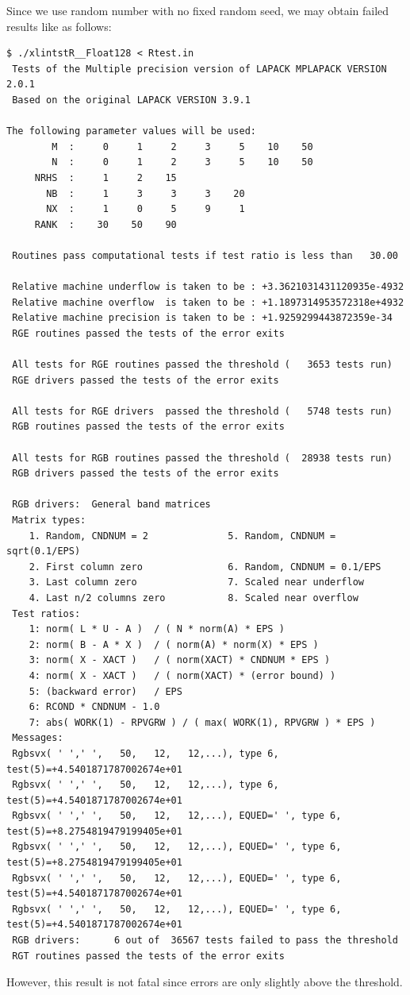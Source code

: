 \documentclass[12pt]{article}
\begin{document}
Since we use random number with no fixed random seed, we may obtain failed results like as follows:
\begin{verbatim}
$ ./xlintstR__Float128 < Rtest.in
 Tests of the Multiple precision version of LAPACK MPLAPACK VERSION 2.0.1
 Based on the original LAPACK VERSION 3.9.1

The following parameter values will be used:
        M  :     0     1     2     3     5    10    50
        N  :     0     1     2     3     5    10    50
     NRHS  :     1     2    15
       NB  :     1     3     3     3    20
       NX  :     1     0     5     9     1
     RANK  :    30    50    90

 Routines pass computational tests if test ratio is less than   30.00

 Relative machine underflow is taken to be : +3.3621031431120935e-4932
 Relative machine overflow  is taken to be : +1.1897314953572318e+4932
 Relative machine precision is taken to be : +1.9259299443872359e-34
 RGE routines passed the tests of the error exits

 All tests for RGE routines passed the threshold (   3653 tests run)
 RGE drivers passed the tests of the error exits

 All tests for RGE drivers  passed the threshold (   5748 tests run)
 RGB routines passed the tests of the error exits

 All tests for RGB routines passed the threshold (  28938 tests run)
 RGB drivers passed the tests of the error exits

 RGB drivers:  General band matrices
 Matrix types:
    1. Random, CNDNUM = 2              5. Random, CNDNUM = sqrt(0.1/EPS)
    2. First column zero               6. Random, CNDNUM = 0.1/EPS
    3. Last column zero                7. Scaled near underflow
    4. Last n/2 columns zero           8. Scaled near overflow
 Test ratios:
    1: norm( L * U - A )  / ( N * norm(A) * EPS )
    2: norm( B - A * X )  / ( norm(A) * norm(X) * EPS )
    3: norm( X - XACT )   / ( norm(XACT) * CNDNUM * EPS )
    4: norm( X - XACT )   / ( norm(XACT) * (error bound) )
    5: (backward error)   / EPS
    6: RCOND * CNDNUM - 1.0
    7: abs( WORK(1) - RPVGRW ) / ( max( WORK(1), RPVGRW ) * EPS )
 Messages:
 Rgbsvx( ' ',' ',   50,   12,   12,...), type 6, test(5)=+4.5401871787002674e+01
 Rgbsvx( ' ',' ',   50,   12,   12,...), type 6, test(5)=+4.5401871787002674e+01
 Rgbsvx( ' ',' ',   50,   12,   12,...), EQUED=' ', type 6, test(5)=+8.2754819479199405e+01
 Rgbsvx( ' ',' ',   50,   12,   12,...), EQUED=' ', type 6, test(5)=+8.2754819479199405e+01
 Rgbsvx( ' ',' ',   50,   12,   12,...), EQUED=' ', type 6, test(5)=+4.5401871787002674e+01
 Rgbsvx( ' ',' ',   50,   12,   12,...), EQUED=' ', type 6, test(5)=+4.5401871787002674e+01
 RGB drivers:      6 out of  36567 tests failed to pass the threshold
 RGT routines passed the tests of the error exits
\end{verbatim}
However, this result is not fatal since errors are only slightly above the threshold.
\end{document}
